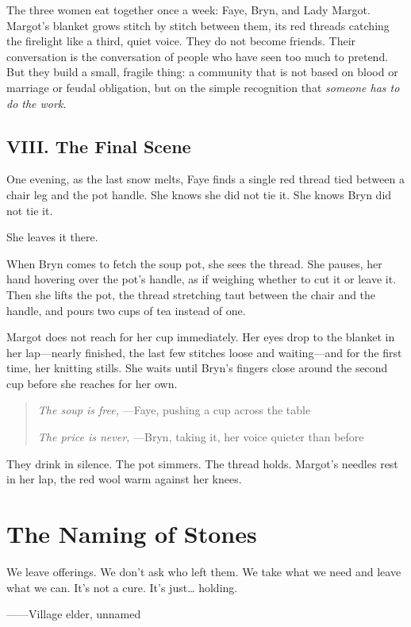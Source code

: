 \documentclass[11pt]{book}
\begin{document}
The three women eat together once a week: Faye, Bryn, and Lady Margot. Margot's blanket grows stitch by stitch between them, its red threads catching the firelight like a third, quiet voice. They do not become friends. Their conversation is the conversation of people who have seen too much to pretend. But they build a small, fragile thing: a community that is not based on blood or marriage or feudal obligation, but on the simple recognition that \textit{someone has to do the work}.

\section*{VIII. The Final Scene}
One evening, as the last snow melts, Faye finds a single red thread tied between a chair leg and the pot handle. She knows she did not tie it. She knows Bryn did not tie it.

She leaves it there.

When Bryn comes to fetch the soup pot, she sees the thread. She pauses, her hand hovering over the pot's handle, as if weighing whether to cut it or leave it. Then she lifts the pot, the thread stretching taut between the chair and the handle, and pours two cups of tea instead of one.

Margot does not reach for her cup immediately. Her eyes drop to the blanket in her lap---nearly finished, the last few stitches loose and waiting---and for the first time, her knitting stills. She waits until Bryn's fingers close around the second cup before she reaches for her own.

\begin{quote}
\textit{The soup is free,} ---Faye, pushing a cup across the table

\textit{The price is never,} ---Bryn, taking it, her voice quieter than before
\end{quote}

They drink in silence. The pot simmers. The thread holds. Margot's needles rest in her lap, the red wool warm against her knees.


\chapter*{The Naming of Stones}
\epigraph{We leave offerings. We don't ask who left them. We take what we need and leave what we can. It's not a cure. It's just\ldots{} holding.}{------Village elder, unnamed}
\end{document}
